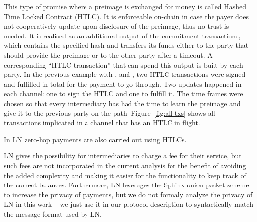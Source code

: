     This type of promise where a preimage is exchanged for money is called
    Hashed Time Locked Contract (HTLC). It is enforceable on-chain in case the
    payer does not cooperatively update upon disclosure of the preimage, thus no
    trust is needed. It is realised as an additional output of the commitment
    transactions, which contains the specified hash and transfers its funds
    either to the party that should provide the preimage or to the other party
    after a timeout. A corresponding ``HTLC transaction'' that can spend this
    output is built by each party. In the previous example with \alice{}, \bob{}
    and \charlie, two HTLC transactions were signed and fulfilled in total for
    the payment to go through. Two updates happened in each channel: one to sign
    the HTLC and one to fulfill it. The time frames were chosen so that every
    intermediary has had the time to learn the preimage and give it to the
    previous party on the path. Figure~\ref{fig:all-txs} shows all transactions
    implicated in a channel that has an HTLC in flight.

    In LN zero-hop payments are also carried out using HTLCs.

    LN gives the possibility for intermediaries to charge a fee for their
    service, but such fees are not incorporated in the current analysis for the
    benefit of avoiding the added complexity and making it easier for the
    functionality to keep track of the correct balances. Furthermore, LN
    leverages the Sphinx onion packet scheme~\cite{sphinx} to increase the
    privacy of payments, but we do not formaly analyze the privacy of LN in this
    work -- we just use it in our protocol description to syntactically match
    the message format used by LN.
